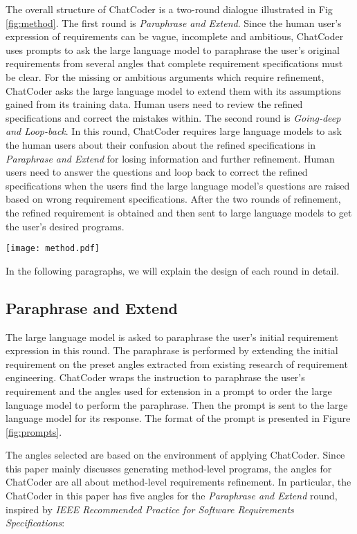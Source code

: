 \documentclass[sigconf]{acmart}
\begin{document}
The overall structure of ChatCoder is a two-round dialogue illustrated in Fig \ref{fig:method}. The first round is \textit{Paraphrase and Extend}. Since the human user's expression of requirements can be vague, incomplete and ambitious, ChatCoder uses prompts to ask the large language model to paraphrase the user's original requirements from several angles that complete requirement specifications must be clear. For the missing or ambitious arguments which require refinement, ChatCoder asks the large language model to extend them with its assumptions gained from its training data. Human users need to review the refined specifications and correct the mistakes within. The second round is \textit{Going-deep and Loop-back}. In this round, ChatCoder requires large language models to ask the human users about their confusion about the refined specifications in \textit{Paraphrase and Extend} for losing information and further refinement. Human users need to answer the questions and loop back to correct the refined specifications when the users find the large language model's questions are raised based on wrong requirement specifications. After the two rounds of refinement, the refined requirement is obtained and then sent to large language models to get the user's desired programs.

\begin{figure*}[htbp]
    \centering
    \texttt{[image: method.pdf]}
    \caption{Overall Structure of the ChatCoder Dialogue Framework}
    \label{fig:method}
\end{figure*}

In the following paragraphs, we will explain the design of each round in detail.

\subsection{Paraphrase and Extend}
The large language model is asked to paraphrase the user's initial requirement expression in this round. The paraphrase is performed by extending the initial requirement on the preset angles extracted from existing research of requirement engineering. ChatCoder wraps the instruction to paraphrase the user's requirement and the angles used for extension in a prompt to order the large language model to perform the paraphrase. Then the prompt is sent to the large language model for its response. The format of the prompt is presented in Figure \ref{fig:prompts}.

The angles selected are based on the environment of applying ChatCoder. Since this paper mainly discusses generating method-level programs, the angles for ChatCoder are all about method-level requirements refinement. In particular, the ChatCoder in this paper has five angles for the \textit{Paraphrase and Extend} round, inspired by \textit{IEEE Recommended Practice for Software Requirements Specifications}:
\end{document}
